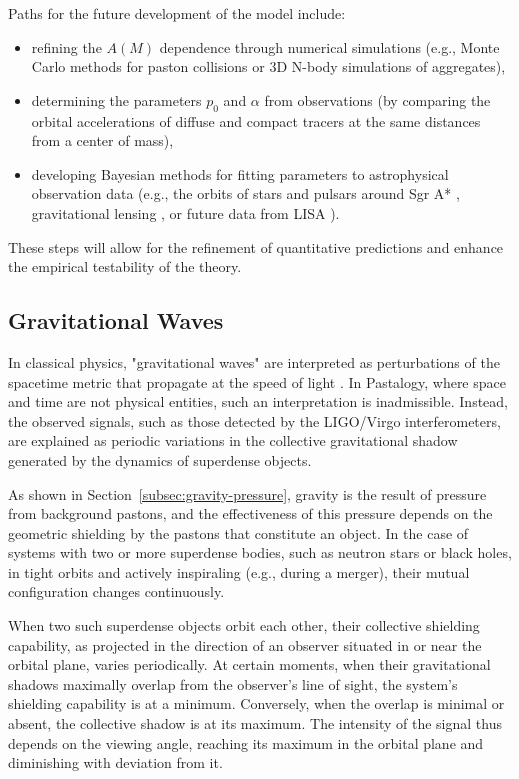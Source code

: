 \documentclass[pdflatex,sn-mathphys-num]{sn-jnl}
\begin{document}
Paths for the future development of the model include:
\begin{itemize}
    \item refining the \( A(M) \) dependence through numerical simulations \cite{newman2013-computational} (e.g., Monte Carlo methods for paston collisions or 3D N-body simulations of aggregates),
    \item determining the parameters \( p_0 \) and \( \alpha \) from observations (by comparing the orbital accelerations of diffuse and compact tracers at the same distances from a center of mass),
    \item developing Bayesian methods for fitting parameters to astrophysical observation data (e.g., the orbits of stars and pulsars around Sgr A* \cite{ghez2008-sgrA}, gravitational lensing \cite{schneider2006-lensing}, or future data from LISA \cite{lisa-consortium2017}).
\end{itemize}
These steps will allow for the refinement of quantitative predictions and enhance the empirical testability of the theory.

\subsection{Gravitational Waves}\label{subsec:gravitational-waves}

In classical physics, "gravitational waves" are interpreted as perturbations of the spacetime metric that propagate at the speed of light \cite{ligo2016-detection}. In Pastalogy, where space and time are not physical entities, such an interpretation is inadmissible. Instead, the observed signals, such as those detected by the LIGO/Virgo interferometers, are explained as periodic variations in the collective gravitational shadow generated by the dynamics of superdense objects.

As shown in Section~\ref{subsec:gravity-pressure}, gravity is the result of pressure from background pastons, and the effectiveness of this pressure depends on the geometric shielding by the pastons that constitute an object. In the case of systems with two or more superdense bodies, such as neutron stars or black holes, in tight orbits and actively inspiraling (e.g., during a merger), their mutual configuration changes continuously.

When two such superdense objects orbit each other, their collective shielding capability, as projected in the direction of an observer situated in or near the orbital plane, varies periodically. At certain moments, when their gravitational shadows maximally overlap from the observer's line of sight, the system's shielding capability is at a minimum. Conversely, when the overlap is minimal or absent, the collective shadow is at its maximum. The intensity of the signal thus depends on the viewing angle, reaching its maximum in the orbital plane and diminishing with deviation from it.
\end{document}
